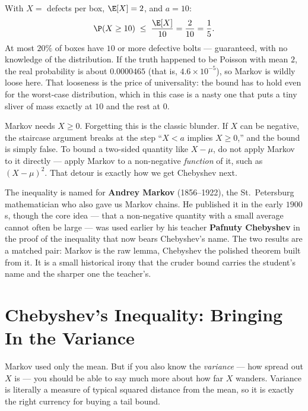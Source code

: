 \begin{example}
\label{ch19:ex-bolts}
With $X = $ defects per box, $\E[X]=2$, and $a=10$:
\[
  \P(X \ge 10) \;\le\; \frac{\E[X]}{10} = \frac{2}{10} = \frac15.
\]
At most $20\%$ of boxes have $10$ or more defective bolts --- guaranteed,
with no knowledge of the distribution. If the truth happened to be Poisson
with mean $2$, the real probability is about $0.0000465$ (that is,
$4.6\times 10^{-5}$), so Markov is wildly loose here. That looseness is the price of universality: the bound has to hold
even for the worst-case distribution, which in this case is a nasty one that
puts a tiny sliver of mass exactly at $10$ and the rest at $0$.
\end{example}

\begin{trapbox}
Markov needs $X \ge 0$. Forgetting this is the classic blunder. If $X$ can be
negative, the staircase argument breaks at the step ``$X < a$ implies
$X \ge 0$,'' and the bound is simply false. To bound a two-sided quantity like
$X-\mu$, do not apply Markov to it directly --- apply Markov to a non-negative
\emph{function} of it, such as $(X-\mu)^2$. That detour is exactly how we get
Chebyshev next.
\end{trapbox}

\begin{historybox}
The inequality is named for \textbf{Andrey Markov} (1856--1922), the St.\
Petersburg mathematician who also gave us Markov chains. He published it in the
early $1900$s, though the core idea --- that a non-negative quantity with a
small average cannot often be large --- was used earlier by his teacher
\textbf{Pafnuty Chebyshev} in the proof of the inequality that now bears
Chebyshev's name. The two results are a matched pair: Markov is the raw
lemma, Chebyshev the polished theorem built from it. It is a small historical
irony that the cruder bound carries the student's name and the sharper one the
teacher's.
\end{historybox}

\section{Chebyshev's Inequality: Bringing In the Variance}
\label{ch19:chebyshev}

Markov used only the mean. But if you also know the \emph{variance} --- how
spread out $X$ is --- you should be able to say much more about how far $X$
wanders. Variance is literally a measure of typical squared distance from the
mean, so it is exactly the right currency for buying a tail bound.

